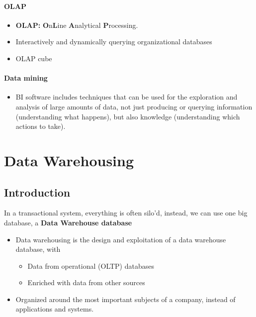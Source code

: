 \documentclass[a4paper,twoside,10pt]{report}
\begin{document}
\paragraph{OLAP}
\begin{itemize}
	\item \textbf{OLAP:} \textbf{O}n\textbf{L}ine \textbf{A}nalytical \textbf{P}rocessing.
	\item Interactively and dynamically querying organizational databases
	\item OLAP cube
\end{itemize}

\paragraph{Data mining}
\begin{itemize}
	\item BI software includes techniques that can  be used for the exploration and analysis of large amounts of data, not just producing or querying information (understanding what happens), but also knowledge (understanding which actions to take).
\end{itemize}

\section{Data Warehousing}
\subsection{Introduction}
In a transactional system, everything is often silo'd, instead, we can use one big database, a \textbf{Data Warehouse database}
\begin{itemize}
	\item Data warehousing is the design and exploitation of a data warehouse database, with
	\begin{itemize}
		\item Data from operational (OLTP) databases
		\item Enriched with data from other sources
	\end{itemize}
	\item Organized around the most important subjects of a company, instead of applications and systems.
\end{itemize}
\end{document}

